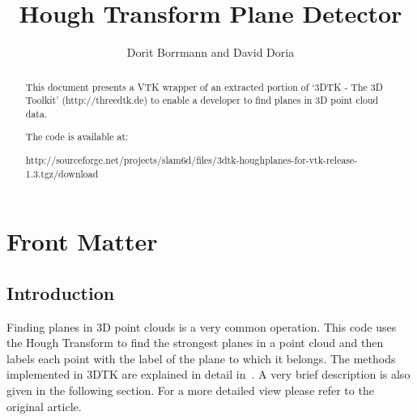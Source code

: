 \documentclass{InsightArticle}
\title{Hough Transform Plane Detector}
\author{Dorit Borrmann and David Doria}
\newcommand{\IJhandlerIDnumber}{3290}
\begin{document}
\IJhandlefooter{\IJhandlerIDnumber}


\ifpdf
\else
\fi


\maketitle


\ifhtml
\chapter*{Front Matter\label{front}}
\fi

\begin{abstract}
\noindent
This document presents a VTK wrapper of an extracted portion of `3DTK - The 3D Toolkit' (http://threedtk.de) to enable a developer to find planes in 3D point cloud data.

\vspace{14pt}

\noindent The code is available at:

\noindent
http://sourceforge.net/projects/slam6d/files/3dtk-houghplanes-for-vtk-release-1.3.tgz/download

\end{abstract}

\IJhandlenote{\IJhandlerIDnumber}

\tableofcontents

\section{Introduction}
Finding planes in 3D point clouds is a very common operation. This code uses the
Hough Transform to find the strongest planes in a point cloud and then labels
each point with the label of the plane to which it belongs. The methods
implemented in 3DTK are explained in detail in~\cite{Borrmann:2011}. A very
brief description is also given in the following section. For a more detailed view please refer to
the original article.
\end{document}
